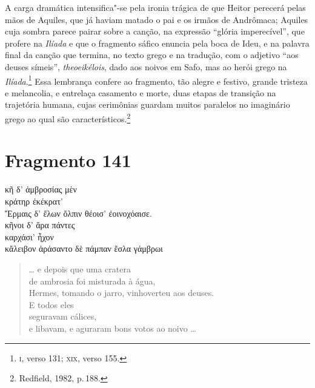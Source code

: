 {A carga dramática intensifica"-se pela ironia trágica de que Heitor perecerá
pelas mãos de Aquiles, que já haviam matado o pai e os irmãos de Andrômaca; Aquiles cuja sombra parece pairar sobre a canção, na expressão ``glória imperecível'', que profere na \textit{Ilíada} e que o fragmento sáfico enuncia pela boca de Ideu, e na palavra final da canção que termina, no texto grego e na tradução, com o adjetivo ``aos deuses símeis'', \textit{theoeikélois}, dado aos noivos em Safo, mas ao herói grego na \textit{Ilíada}.\footnote{\textsc{i}, verso 131; \textsc{xix}, verso 155.}
Essa lembrança confere ao fragmento, tão alegre e festivo, grande tristeza e
melancolia, e entrelaça casamento e morte, duas etapas de transição na trajetória
humana, cujas cerimônias guardam muitos paralelos no imaginário grego ao qual são característicos.\footnote{Redfield, 1982, p.\,188.}}



\pagebreak
\section{Fragmento 141}

\begin{gkverse}
κῆ δ’ ἀμβροσίας μὲν\\
κράτηρ ἐκέκρατ’\\
Ἔρμαις δ’ ἔλων ὄλπιν θέοισ’ ἐοινοχόαισε.\\
κῆνοι δ’ ἄρα πάντες\\
καρχάσι’ ἦχον\\
κἄλειβον ἀράσαντο δὲ πάμπαν ἔσλα γάμβρωι
\end{gkverse}

\begin{verse}
\ldots{} e depois que uma cratera\\
de ambrosia foi misturada à água,\\
Hermes, tomando o jarro, vinhoverteu aos deuses.\\
E todos eles\\
seguravam cálices,\\
e libavam, e aguraram bons votos ao noivo \ldots{}
\end{verse}

\medskip


